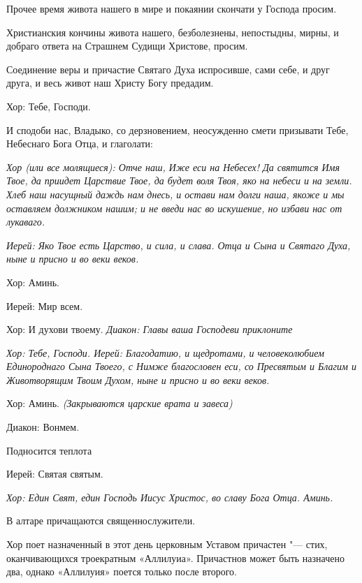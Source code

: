   Прочее время живота нашего в мире и покаянии скончати у Господа просим. 


  Христианския кончины живота нашего, безболезнены, непостыдны, мирны, и добраго ответа на Страшнем Судищи Христове, просим. 


  Соединение веры и причастие Святаго Духа испросивше, сами себе, и друг друга, и весь живот наш Христу Богу предадим. \itshape 


  Хор:\normalfont{} Тебе, Господи. 


  И сподоби нас, Владыко, со дерзновением, неосужденно смети призывати Тебе, Небеснаго Бога Отца, и глаголати: 




\itshape  Хор (или все молящиеся):\normalfont{} Отче наш, Иже еси на Небесех! Да святится Имя Твое, да приидет Царствие Твое, да будет воля Твоя, яко на небеси и на земли. Хлеб наш насущный даждь нам днесь, и остави нам долги наша, якоже и мы оставляем должником нашим; и не введи нас во искушение, но избави нас от лукаваго. 


\itshape  Иерей:\normalfont{} Яко Твое есть Царство, и сила, и слава. Отца и Сына и Святаго Духа, ныне и присно и во веки веков. \itshape 


  Хор:\normalfont{} Аминь. \itshape 


  Иерей:\normalfont{} Мир всем. \itshape 


  Хор:\normalfont{} И духови твоему. \itshape  Диакон:\normalfont{} Главы ваша Господеви приклоните


\itshape Хор:\normalfont{} Тебе, Господи. \itshape  Иерей:\normalfont{} Благодатию, и щедротами, и человеколюбием Единороднаго Сына Твоего, с Нимже благословен еси, со Пресвятым и Благим и Животворящим Твоим Духом, ныне и присно и во веки веков. \itshape 


  Хор:\normalfont{} Аминь. \itshape  (Закрываются царские врата и завеса)


  Диакон:\normalfont{} Вонмем. \itshape 


  Подносится теплот\normalfont{}а \itshape 


  Иерей:\normalfont{} Святая святым. 


\itshape  Хор:\normalfont{} Един Свят, един Господь Иисус Христос, во славу Бога Отца. Аминь. 




  В алтаре причащаются священнослужители. 


Хор поет назначенный в этот день церковным Уставом причастен "--- стих, оканчивающихся троекратным «Аллилуиа». Причастнов может быть назначено два, однако «Аллилуия» поется только после второго. 


